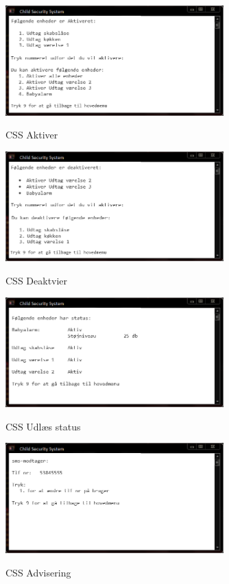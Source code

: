 \begin{figure}[h] \centering
{\includegraphics[width=0.75\textwidth]{billeder/cmdprompt/CSS_aktiver}}
\caption{CSS Aktiver}
\end{figure}

\begin{figure}[h] \centering
{\includegraphics[width=0.75\textwidth]{billeder/cmdprompt/CSS_deaktiver}}
\caption{CSS Deaktvier}
\end{figure}

\begin{figure}[h] \centering
{\includegraphics[width=0.75\textwidth]{billeder/cmdprompt/CSS_vis_status}}
\caption{CSS Udlæs status}
\end{figure}

\begin{figure}[h] \centering
{\includegraphics[width=0.75\textwidth]{billeder/cmdprompt/CSS_advisering}}
\caption{CSS Advisering}
\end{figure}

